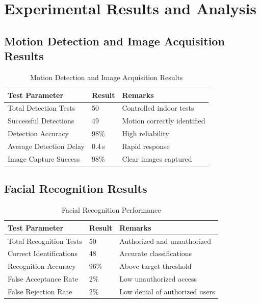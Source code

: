 \documentclass[12pt,a4paper,oneside]{report}
\begin{document}
\section{Experimental Results and Analysis}

\subsection{Motion Detection and Image Acquisition Results}

\begin{table}[htbp]
  \centering
  \caption{Motion Detection and Image Acquisition Results}
  {\small
  \begin{tabular}{|p{5.00cm}|p{3.00cm}|p{6.00cm}|}
    \hline
    \textbf{Test Parameter} & \textbf{Result} & \textbf{Remarks} \\
    \hline
    Total Detection Tests     & 50           & Controlled indoor tests \\
    Successful Detections     & 49           & Motion correctly identified \\
    Detection Accuracy        & 98\%         & High reliability \\
    Average Detection Delay   & 0.4\,s       & Rapid response \\
    Image Capture Success     & 98\%         & Clear images captured \\
    \hline
  \end{tabular}
  }
\end{table}

\subsection{Facial Recognition Results}

\begin{table}[htbp]
  \centering
  \caption{Facial Recognition Performance}
  {\small
  \begin{tabular}{|p{5.00cm}|p{3.00cm}|p{6.00cm}|}
    \hline
    \textbf{Test Parameter} & \textbf{Result} & \textbf{Remarks} \\
    \hline
    Total Recognition Tests     & 50    & Authorized and unauthorized \\
    Correct Identifications     & 48    & Accurate classifications \\
    Recognition Accuracy        & 96\%  & Above target threshold \\
    False Acceptance Rate       & 2\%   & Low unauthorized access \\
    False Rejection Rate        & 2\%   & Low denial of authorized users \\
    \hline
  \end{tabular}
  }
\end{table}
\end{document}

